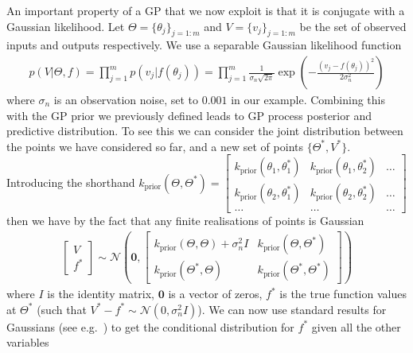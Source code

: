 An important property of a GP that we now exploit is that it is conjugate with a 
Gaussian likelihood.
Let ${\Theta} = \{\theta_j\}_{j=1:m}$ and ${V} = \{{v}_j\}_{j=1:m}$ 
be the set of observed inputs and outputs respectively.
We use a separable Gaussian likelihood function
\begin{align}
\label{eq:opt:GP-lik}
p({V}| {\Theta}, f) = \prod_{j=1}^{m}p({v}_j | f(\theta_j)) = \prod_{j=1}^{m}\frac{1}{\sigma_{n}\sqrt{2\pi}} \exp \left(-\frac{\left({v}_j-f(\theta_j)\right)^2}{2\sigma_n^2}\right)
\end{align}
where $\sigma_n$ is an observation noise, set to $0.001$ in our example.  Combining this with the GP prior
we previously defined leads to GP process posterior and predictive distribution.
To see this we can consider the joint distribution between the points we have
considered so far, and a new set of points $\{{\Theta}^*,{V}^*\}$.
Introducing the shorthand $k_{\text{prior}}({\Theta},{\Theta}^*) = \left[\begin{smallmatrix} k_{\text{prior}}(\theta_1,\theta_1^*) & k_{\text{prior}}(\theta_1,\theta_2^*) & \dots\\ k_{\text{prior}}(\theta_2,\theta_1^*) & k_{\text{prior}}(\theta_2,\theta_2^*) & \dots \\ \dots & \dots & \dots\end{smallmatrix}\right]$ then we have by the fact that
any finite realisations of points is Gaussian
\begin{align}
\label{eq:opt:GP-joint}
\left[\begin{matrix} 
V \\ f^*
\end{matrix}\right] \sim \mathcal{N} \left(\mathbf{0}, \left[
\begin{matrix}
k_{\text{prior}}({\Theta},{\Theta})+\sigma_n^2 I & k_{\text{prior}}({\Theta},{\Theta}^*) \\
k_{\text{prior}}({\Theta}^*,{\Theta}) & k_{\text{prior}}({\Theta}^*,{\Theta}^*)
\end{matrix}
\right]\right)
\end{align}
where $I$ is the identity matrix, $\mathbf{0}$ is a vector of zeros, $f^*$ is the true
function values at ${\Theta}^*$ (such that $V^*-f^*\sim\mathcal{N}(0,\sigma_n^2 I)$).
We can now use standard results for Gaussians (see e.g.~\cite{petersen2008matrix}) to get
the conditional distribution for $f^*$ given all the other variables
